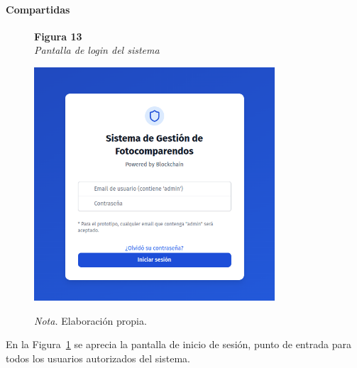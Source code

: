 \paragraph{Compartidas}
 \begin{figure}[htbp]
    \begin{flushleft}
        \textbf{Figura 13}\\[2em]
        \textit{Pantalla de login del sistema}
    \end{flushleft}
    \vspace{1em}
    \centering
    \includegraphics[width=0.8\textwidth]{Images/UI1.png}
    \vspace{2em}
    \begin{flushleft}
        \textit{Nota.} Elaboración propia.
    \end{flushleft}
    \label{fig:login}
\end{figure}

En la Figura~\ref{fig:login} se aprecia la pantalla de inicio de sesión, punto de entrada para todos los usuarios autorizados del sistema.


